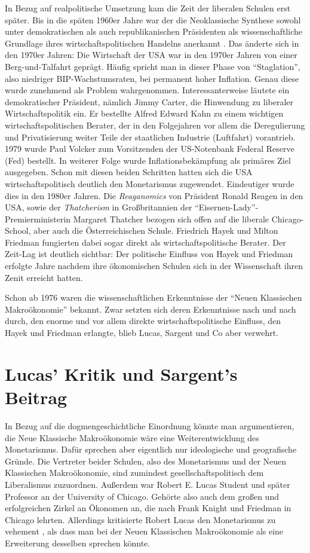 In Bezug auf realpolitische Umsetzung kam die Zeit der liberalen Schulen erst später. Bis in die späten 1960er Jahre war der die Neoklassische Synthese sowohl unter demokratischen als auch republikanischen Präsidenten als wissenschaftliche Grundlage ihres wirtschaftspolitischen Handelns anerkannt \parencite[S. 12]{Woodford1999}. Das änderte sich in den 1970er Jahren: Die Wirtschaft der USA war in den 1970er Jahren von einer Berg-und-Talfahrt geprägt. Häufig spricht man in dieser Phase von "`Staglation"', also niedriger BIP-Wachstumsraten, bei permanent hoher Inflation. Genau diese wurde zunehmend als Problem wahrgenommen. Interessanterweise läutete ein demokratischer Präsident, nämlich Jimmy Carter, die Hinwendung zu liberaler Wirtschaftspolitik ein. Er bestellte Alfred Edward Kahn zu einem wichtigen wirtschaftspolitischen Berater, der in den Folgejahren vor allem die Deregulierung und Privatisierung weiter Teile der staatlichen Industrie (Luftfahrt) vorantrieb. 1979 wurde Paul Volcker zum Vorsitzenden der US-Notenbank Federal Reserve (Fed) bestellt. In weiterer Folge wurde Inflationsbekämpfung als primäres Ziel ausgegeben. Schon mit diesen beiden Schritten hatten sich die USA wirtschaftspolitisch deutlich den Monetarismus zugewendet. Eindeutiger wurde dies in den 1980er Jahren. Die \textit{Reaganomics} von Präsident Ronald Reagen in den USA, sowie der \textit{Thatcherism} in Großbritannien der "`Eisernen-Lady"'-Premierministerin Margaret Thatcher bezogen sich offen auf die liberale Chicago-School, aber auch die Österreichischen Schule. Friedrich Hayek und Milton Friedman fungierten dabei sogar direkt als wirtschaftspolitische Berater. Der Zeit-Lag ist deutlich sichtbar: Der politische Einfluss von Hayek und Friedman erfolgte Jahre nachdem ihre ökonomischen Schulen sich in der Wissenschaft ihren Zenit erreicht hatten.

Schon ab 1976 waren die wissenschaftlichen Erkenntnisse der "`Neuen Klassischen Makroökonomie"' bekannt. Zwar setzten sich deren Erkenntnisse nach und nach durch, den enorme und vor allem direkte wirtschaftspolitische Einfluss, den Hayek und Friedman erlangte, blieb Lucas, Sargent und Co aber verwehrt.



\section{Lucas' Kritik und Sargent's Beitrag}
In Bezug auf die dogmengeschichtliche Einordnung könnte man argumentieren, die Neue Klassische Makroökonomie wäre eine Weiterentwicklung des Monetarismus. Dafür sprechen aber eigentlich nur ideologische und geografische Gründe. Die Vertreter beider Schulen, also des Monetarismus und der Neuen Klassischen Makroökonomie, sind zumindest gesellschaftspolitisch dem Liberalismus zuzuordnen. Außerdem war Robert E. Lucas Student und später Professor an der University of Chicago. Gehörte also auch dem großen und erfolgreichen Zirkel an Ökonomen an, die nach Frank Knight und Friedman in Chicago lehrten. Allerdings kritisierte Robert Lucas den Monetarismus zu vehement \parencite[S. 121]{Lucas1972}, als dass man bei der Neuen Klassischen Makroökonomie als eine Erweiterung desselben sprechen könnte.  

